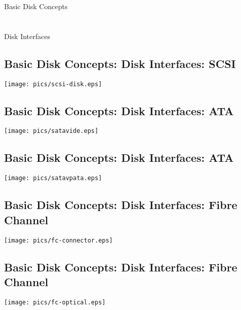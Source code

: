 \documentclass[xga]{xdvislides}
\begin{document}
\newpage
\vspace*{\fill}
\begin{center}
	\Hugesize
		Basic Disk Concepts \\ [1em]
	\hspace*{5mm}
	\blueline\\
	\hspace*{5mm}\\
		Disk Interfaces
\end{center}
\vspace*{\fill}

\subsection{Basic Disk Concepts: Disk Interfaces: SCSI}
\vfill
	\begin{center}
		\texttt{[image: pics/scsi-disk.eps]} \\
	\end{center}
\vfill

\subsection{Basic Disk Concepts: Disk Interfaces: ATA}
\vfill
	\begin{center}
		\texttt{[image: pics/satavide.eps]} \\
	\end{center}
\vfill

\subsection{Basic Disk Concepts: Disk Interfaces: ATA}
\vfill
	\begin{center}
		\texttt{[image: pics/satavpata.eps]} \\
	\end{center}
\vfill



\subsection{Basic Disk Concepts: Disk Interfaces: Fibre Channel}
\vfill
	\begin{center}
		\texttt{[image: pics/fc-connector.eps]} \\
	\end{center}
\vfill

\subsection{Basic Disk Concepts: Disk Interfaces: Fibre Channel}
\vfill
	\begin{center}
		\texttt{[image: pics/fc-optical.eps]} \\
	\end{center}
\vfill
\end{document}
